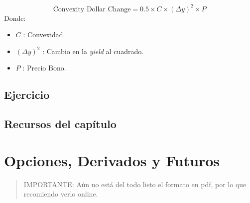 \documentclass[12pt,]{book}
\providecommand{\tightlist}{%
  \setlength{\itemsep}{0pt}\setlength{\parskip}{0pt}}
\begin{document}
\[
\text{Convexity Dollar Change} = 0.5 \times C \times (\Delta y)^2 \times P 
\] Donde:

\begin{itemize}
\tightlist
\item
  \(C\) : Convexidad.
\item
  \((\Delta y)^2\) : Cambio en la \emph{yield} al cuadrado.
\item
  \(P\) : Precio Bono.
\end{itemize}

\section{Ejercicio}\label{ejercicio}

\section{Recursos del capítulo}\label{recursos-del-capitulo-1}

\chapter{Opciones, Derivados y Futuros}\label{options}

\begin{quote}
IMPORTANTE: Aún no está del todo listo el formato en pdf, por lo que
recomiendo verlo online.
\end{quote}


\end{document}
